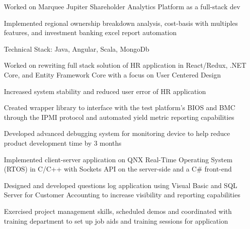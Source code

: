 \documentclass[]{deedy-resume-openfont}
\begin{document}
\begin{minipage}[t]{0.66\textwidth}
\begin{tightemize}\item Worked on Marquee Jupiter Shareholder Analytics Platform as a full-stack dev \item Implemented regional ownership breakdown analysis, cost-basis with multiples features, and investment banking excel report automation \item Technical Stack: Java, Angular, Scala, MongoDb
\end{tightemize}
\sectionsep

\begin{tightemize}
\item Worked on rewriting full stack solution of HR application in React/Redux, .NET Core, and Entity Framework Core with a focus on User Centered Design \item Increased system stability and reduced user error of HR application
\end{tightemize}
\sectionsep

\begin{tightemize}
\item Created wrapper library to interface with the test platform’s BIOS and BMC through the IPMI protocol and automated yield metric reporting capabilities
\end{tightemize}
\sectionsep

\begin{tightemize}
\item Developed advanced debugging system for monitoring device to help reduce product development time by 3 months\item Implemented client-server application on QNX Real-Time Operating System (RTOS) in C/C++ with Sockets API on the server-side and  a C\# front-end \end{tightemize}
\sectionsep

\begin{tightemize}
\item Designed and developed questions log application using Visual Basic and SQL Server for Customer Accounting to increase visibility and reporting capabilities \item	Exercised project management skills, scheduled demos and coordinated with training department to set up job aids and training sessions for application \end{tightemize}
\sectionsep


\end{minipage}
\end{document}
